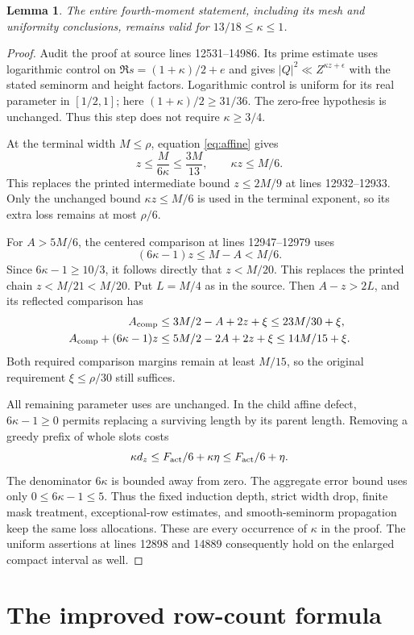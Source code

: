 \documentclass[11pt]{article}
\newtheorem{lemma}{Lemma}
\begin{document}
\begin{lemma}\label{lem:extension}
The entire fourth-moment statement, including its mesh and uniformity
conclusions, remains valid for $13/18\le\kappa\le1$.
\end{lemma}
\begin{proof}
Audit the proof at source lines 12531--14986. Its prime estimate uses
logarithmic control on $\Re s=(1+\kappa)/2+e$ and gives
$|Q|^2\ll Z^{\kappa z+\epsilon}$ with the stated seminorm and height
factors. Logarithmic control is uniform for its real parameter in
$[1/2,1]$; here $(1+\kappa)/2\ge31/36$. The zero-free hypothesis is
unchanged. Thus this step does not require $\kappa\ge3/4$.

At the terminal width $M\le\rho$, equation \eqref{eq:affine} gives
\[
 z\le\frac{M}{6\kappa}\le\frac{3M}{13},\qquad
 \kappa z\le M/6.
\]
This replaces the printed intermediate bound $z\le2M/9$ at lines
12932--12933. Only the unchanged bound $\kappa z\le M/6$ is used in
the terminal exponent, so its extra loss remains at most $\rho/6$.

For $A>5M/6$, the centered comparison at lines 12947--12979 uses
\[
 (6\kappa-1)z\le M-A<M/6.
\]
Since $6\kappa-1\ge10/3$, it follows directly that $z<M/20$.
This replaces the printed chain $z<M/21<M/20$. Put $L=M/4$ as in
the source. Then $A-z>2L$, and its reflected comparison has
\begin{align*}
 A_{\rm comp}&\le3M/2-A+2z+\xi\le23M/30+\xi,\\
 A_{\rm comp}+(6\kappa-1)z
 &\le5M/2-2A+2z+\xi\le14M/15+\xi.
\end{align*}
Both required comparison margins remain at least $M/15$, so the
original requirement $\xi\le\rho/30$ still suffices.

All remaining parameter uses are unchanged. In the child affine defect,
$6\kappa-1\ge0$ permits replacing a surviving length by its parent
length. Removing a greedy prefix of whole slots costs
\[
 \kappa d_z\le F_{\rm act}/6+\kappa\eta\le F_{\rm act}/6+\eta.
\]
The denominator $6\kappa$ is bounded away from zero. The aggregate
error bound uses only $0\le6\kappa-1\le5$. Thus the fixed induction
depth, strict width drop, finite mask treatment, exceptional-row estimates,
and smooth-seminorm propagation keep the same loss allocations.
These are every occurrence of $\kappa$ in the proof. The uniform assertions
at lines 12898 and 14889 consequently hold on the enlarged compact
interval as well.
\end{proof}

\section{The improved row-count formula}
\end{document}
